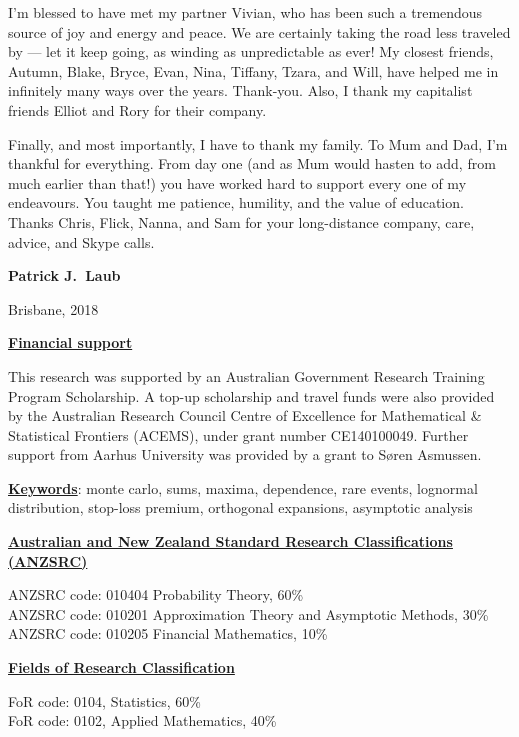 I'm blessed to have met my partner Vivian, who has been such a tremendous source of joy and energy and peace. We are certainly taking the road less traveled by --- let it keep going, as winding as unpredictable as ever! My closest friends, Autumn, Blake, Bryce, Evan, Nina, Tiffany, Tzara, and Will, have helped me in infinitely many ways over the years. Thank-you. Also, I thank my capitalist friends Elliot and Rory for their company.

Finally, and most importantly, I have to thank my family. To Mum and Dad, I'm thankful for everything. From day one (and as Mum would hasten to add, from much earlier than that!) you have worked hard to support every one of my endeavours. You taught me patience, humility, and the value of education. Thanks Chris, Flick, Nanna, and Sam for your long-distance company, care, advice, and Skype calls.

\hfill {\bf Patrick J.\ Laub}

\vspace{-0.8em}
\hfill Brisbane, 2018

\newpage
{\bf \underline{Financial support}}

This research was supported by an Australian Government Research Training Program Scholarship.
A top-up scholarship and travel funds were also provided by the Australian Research Council Centre of Excellence for
Mathematical \& Statistical Frontiers (ACEMS), under grant number CE140100049. Further support from Aarhus University was provided by a grant to S{\o}ren Asmussen.

{\bf \underline{Keywords}}: monte carlo, sums, maxima, dependence, rare events, lognormal distribution, stop-loss premium, orthogonal expansions, asymptotic analysis


{\bf \underline{Australian and New Zealand Standard Research Classifications
(ANZSRC)}}

ANZSRC code: 010404 Probability Theory, 60\% \\
ANZSRC code: 010201 Approximation Theory and Asymptotic Methods, 30\% \\
ANZSRC code: 010205 Financial Mathematics, 10\%


{\bf \underline{Fields of Research Classification}}

FoR code: 0104, Statistics, 60\% \\
FoR code: 0102, Applied Mathematics, 40\%

\tableofcontents

\newpage

